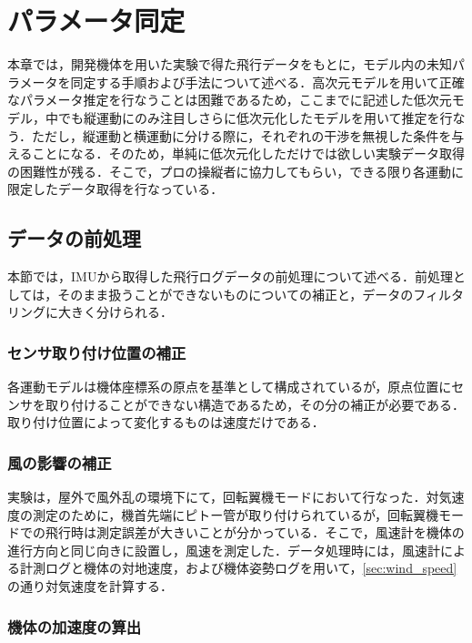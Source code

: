 
\chapter{パラメータ同定}
\label{sys_id}

本章では，開発機体を用いた実験で得た飛行データをもとに，モデル内の未知パラメータを同定する手順および手法について述べる．高次元モデルを用いて正確なパラメータ推定を行なうことは困難であるため，ここまでに記述した低次元モデル，中でも縦運動にのみ注目しさらに低次元化したモデルを用いて推定を行なう．ただし，縦運動と横運動に分ける際に，それぞれの干渉を無視した条件を与えることになる．そのため，単純に低次元化しただけでは欲しい実験データ取得の困難性が残る．そこで，プロの操縦者に協力してもらい，できる限り各運動に限定したデータ取得を行なっている．\label{da}

\section{データの前処理}

本節では，IMUから取得した飛行ログデータの前処理について述べる．前処理としては，そのまま扱うことができないものについての補正と，データのフィルタリングに大きく分けられる．

\subsection{センサ取り付け位置の補正}

各運動モデルは機体座標系の原点を基準として構成されているが，原点位置にセンサを取り付けることができない構造であるため，その分の補正が必要である．取り付け位置によって変化するものは速度だけである．

\subsection{風の影響の補正}

実験は，屋外で風外乱の環境下にて，回転翼機モードにおいて行なった．対気速度の測定のために，機首先端にピトー管が取り付けられているが，回転翼機モードでの飛行時は測定誤差が大きいことが分かっている．そこで，風速計を機体の進行方向と同じ向きに設置し，風速を測定した．データ処理時には，風速計による計測ログと機体の対地速度，および機体姿勢ログを用いて，\ref{sec:wind_speed}の通り対気速度を計算する．

\subsection{機体の加速度の算出}

